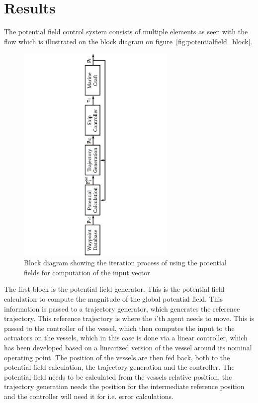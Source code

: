 \documentclass[a4paper,conference]{IEEEtran}
\newcommand{\colwidth}{3in}
\begin{document}
\section{Results}
The potential field control system consists of multiple elements
as seen with the flow which is illustrated on the block diagram on
figure~\vref{fig:potentialfield_block}.
\begin{figure}[htbp]
\centering
\includegraphics[width=\colwidth]{fig/potentialfield_block}
\caption{Block diagram showing the iteration process of using the
potential fields for computation of the input vector}
\label{fig:potentialfield_block}
\end{figure}
The first block is the potential field generator. This is the
potential field calculation to compute the magnitude of the global
potential field. This information is passed to a trajectory generator,
which generates the reference trajectory. This reference trajectory is
where the $i$'th agent needs to move. This is passed to the controller
of the vessel, which then computes the input to the actuators on the
vessels, which in this case is done via a linear controller, which has been developed based on a linearized version of the vessel around its nominal operating point. The position of the vessels are then fed back, both to the
potential field calculation, the trajectory generation and the
controller. The potential field needs to be calculated from the
vessels relative position, the trajectory generation needs the
position for the intermediate reference position and the controller
will need it for i.e. error calculations.
\end{document}
